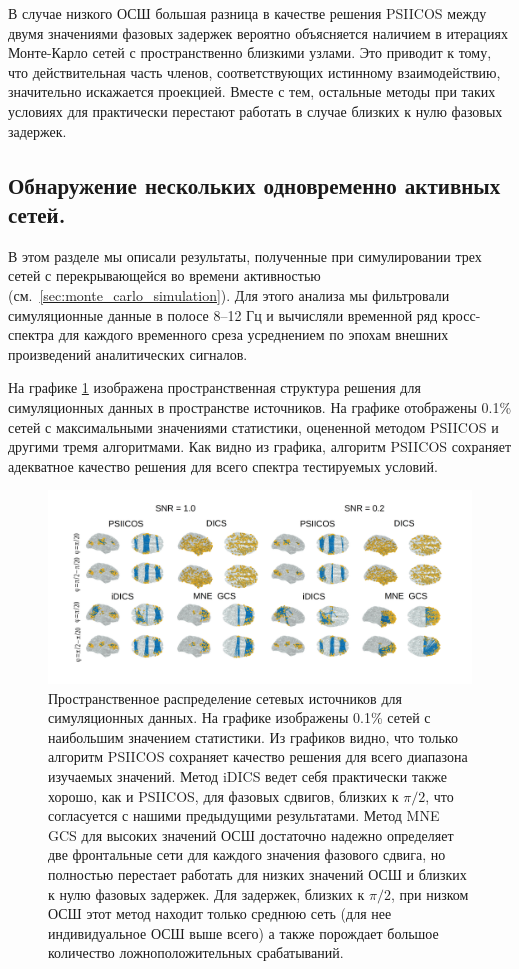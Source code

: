 В случае низкого ОСШ большая разница в качестве решения PSIICOS между двумя
значениями фазовых задержек вероятно объясняется наличием в итерациях
Монте-Карло сетей с пространственно близкими узлами. Это приводит к тому, что
действительная часть членов, соответствующих истинному взаимодействию,
значительно искажается проекцией. Вместе с тем, остальные методы при таких
условиях для практически перестают работать в случае близких к нулю фазовых задержек.

\subsection{Обнаружение нескольких одновременно активных сетей.}
В этом разделе мы описали результаты, полученные при симулировании трех сетей с
перекрывающейся во времени активностью (см.~\ref{sec:monte_carlo_simulation}). Для этого анализа мы
фильтровали симуляционные данные в полосе 8--12 Гц и вычисляли временной ряд кросс-спектра
для каждого временного среза
усреднением по эпохам внешних произведений аналитических сигналов.

На графике \ref{fig:05} изображена пространственная структура решения для
симуляционных данных в пространстве источников. На графике отображены 0.1\% сетей
с максимальными значениями статистики, оцененной методом PSIICOS и другими тремя
алгоритмами. Как видно из графика, алгоритм PSIICOS сохраняет адекватное качество решения
для всего спектра тестируемых условий.

\begin{figure}[!ht]
 \includegraphics[width=1\textwidth]{../images/psiicos_paper/Figure5_hr.jpg}
 \caption{Пространственное распределение сетевых источников для симуляционных данных.
     На графике изображены 0.1\% сетей с наибольшим значением
     статистики. Из графиков видно, что только алгоритм PSIICOS сохраняет
     качество решения для всего диапазона изучаемых значений.
     Метод iDICS ведет себя практически также хорошо, как и PSIICOS,
     для фазовых сдвигов, близких к $\pi/2$, что согласуется с нашими предыдущими
     результатами. Метод MNE GCS для высоких значений ОСШ достаточно надежно определяет
     две фронтальные сети для каждого значения фазового сдвига, но полностью перестает
     работать для низких значений ОСШ и близких к нулю фазовых задержек. Для задержек,
     близких к $\pi/2$, при низком ОСШ этот метод находит только среднюю сеть
     (для нее индивидуальное ОСШ выше всего) а также порождает большое количество
     ложноположительных срабатываний.
 }\label{fig:05} %
\end{figure}%

